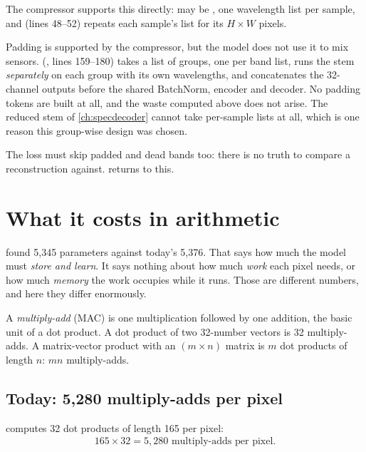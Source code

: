 The compressor supports this directly:  may be , one wavelength list per sample, and  (lines 48--52) repeats each sample's list for its $H\times W$ pixels.

\begin{sourcenote}
Padding is supported by the compressor, but the model does not use it to mix sensors.  (, lines 159--180) takes a list of groups, one per band list, runs the stem \emph{separately} on each group with its own  wavelengths, and concatenates the 32-channel outputs before the shared BatchNorm, encoder and decoder. No padding tokens are built at all, and the waste computed above does not arise. The reduced stem of \cref{ch:specdecoder} cannot take per-sample lists at all, which is one reason this group-wise design was chosen.
\end{sourcenote}

The loss must skip padded and dead bands too: there is no truth to compare a reconstruction against.  returns to this.

\section{What it costs in arithmetic}\label{sec:crossstem:cost}

 found 5,345 parameters against today's 5,376. That says how much the model must \emph{store and learn}. It says nothing about how much \emph{work} each pixel needs, or how much \emph{memory} the work occupies while it runs. Those are different numbers, and here they differ enormously.

A \emph{multiply-add} (MAC) is one multiplication followed by one addition, the basic unit of a dot product. A dot product of two 32-number vectors is 32 multiply-adds. A matrix-vector product with an $(m\times n)$ matrix is $m$ dot products of length $n$: $mn$ multiply-adds.

\subsection{Today: 5,280 multiply-adds per pixel}

 computes 32 dot products of length 165 per pixel:
\begin{align*}
  165\times32 = 5{,}280 \text{ multiply-adds per pixel.}
\end{align*}

